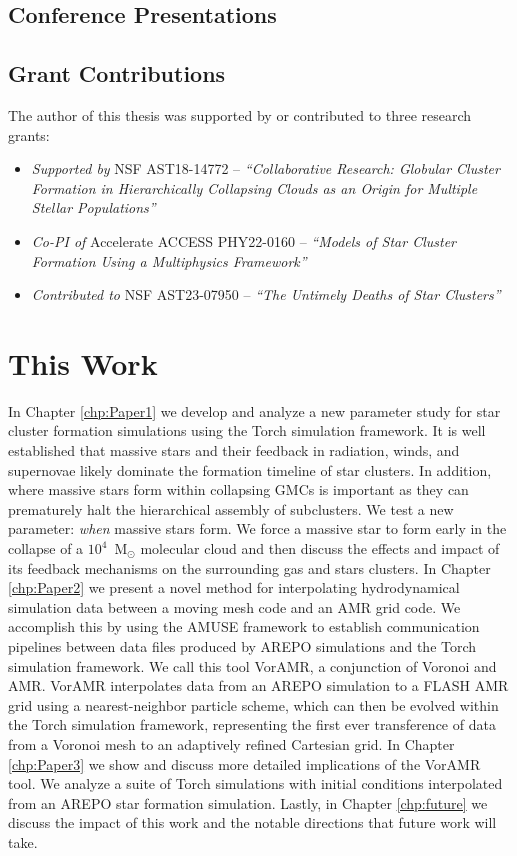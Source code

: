 \documentclass[twoside]{drexel-thesis}
\begin{document}
\begin{thesis}
\subsection{Conference Presentations}

\subsection{Grant Contributions}

The author of this thesis was supported by or contributed to three research grants:
\begin{itemize}
    \item \emph{Supported by} NSF AST18-14772 -- \emph{``Collaborative Research: Globular Cluster Formation in Hierarchically Collapsing Clouds as an Origin for Multiple Stellar Populations''}
    
    \item \emph{Co-PI of} Accelerate ACCESS PHY22-0160 -- \emph{``Models of Star Cluster Formation Using a Multiphysics Framework''}

    \item \emph{Contributed to} NSF AST23-07950 -- \emph{``The Untimely Deaths of Star Clusters''}
\end{itemize}

\section{This Work}

In Chapter \ref{chp:Paper1} we develop and analyze a new parameter study for star cluster formation simulations using the Torch simulation framework. It is well established that massive stars and their feedback in radiation, winds, and supernovae likely dominate the formation timeline of star clusters. In addition, where massive stars form within collapsing GMCs is important as they can prematurely halt the hierarchical assembly of subclusters. We test a new parameter: \emph{when} massive stars form. We force a massive star to form early in the collapse of a $10^4$~M$_\odot$ molecular cloud and then discuss the effects and impact of its feedback mechanisms on the surrounding gas and stars clusters. In Chapter \ref{chp:Paper2} we present a novel method for interpolating hydrodynamical simulation data between a moving mesh code and an AMR grid code. We accomplish this by using the AMUSE framework to establish communication pipelines between data files produced by AREPO simulations and the Torch simulation framework. We call this tool VorAMR, a conjunction of Voronoi and AMR. VorAMR interpolates data from an AREPO simulation to a FLASH AMR grid using a nearest-neighbor particle scheme, which can then be evolved within the Torch simulation framework, representing the first ever transference of data from a Voronoi mesh to an adaptively refined Cartesian grid. In Chapter \ref{chp:Paper3} we show and discuss more detailed implications of the VorAMR tool. We analyze a suite of Torch simulations with initial conditions interpolated from an AREPO star formation simulation. Lastly, in Chapter \ref{chp:future} we discuss the impact of this work and the notable directions that future work will take.



\end{thesis}
\end{document}
